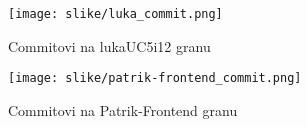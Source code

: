 		\begin{figure}[H]
			\texttt{[image: slike/luka\_commit.png]} %
			\centering
			\caption{Commitovi na lukaUC5i12 granu}
			\label{fig:lukacommit}
		\end{figure}
	
		\begin{figure}[H]
			\texttt{[image: slike/patrik-frontend\_commit.png]} %
			\centering
			\caption{Commitovi na Patrik-Frontend granu}
			\label{fig:patrikcommit}
		\end{figure}